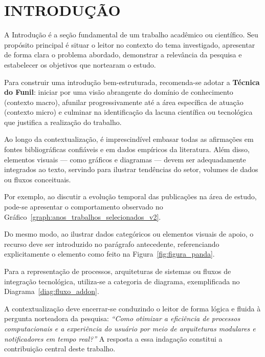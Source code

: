 \chapter{INTRODUÇÃO}
\label{chap:contextualizacao}

A Introdução é a seção fundamental de um trabalho acadêmico ou científico. Seu propósito principal é situar o leitor no contexto do tema investigado, apresentar de forma clara o problema abordado, demonstrar a relevância da pesquisa e estabelecer os objetivos que nortearam o estudo.

Para construir uma introdução bem-estruturada, recomenda-se adotar a \textbf{Técnica do Funil}: iniciar por uma visão abrangente do domínio de conhecimento (contexto macro), afunilar progressivamente até a área específica de atuação (contexto micro) e culminar na identificação da lacuna científica ou tecnológica que justifica a realização do trabalho.

Ao longo da contextualização, é imprescindível embasar todas as afirmações em fontes bibliográficas confiáveis e em dados empíricos da literatura. Além disso, elementos visuais — como gráficos e diagramas — devem ser adequadamente integrados ao texto, servindo para ilustrar tendências do setor, volumes de dados ou fluxos conceituais.

Por exemplo, ao discutir a evolução temporal das publicações na área de estudo, pode-se apresentar o comportamento observado no Gráfico~\ref{graph:anos_trabalhos_selecionados_v2}.



Do mesmo modo, ao ilustrar dados categóricos ou elementos visuais de apoio, o recurso deve ser introduzido no parágrafo antecedente, referenciando explicitamente o elemento como feito na Figura~\ref{fig:figura_panda}.



Para a representação de processos, arquiteturas de sistemas ou fluxos de integração tecnológica, utiliza-se a categoria de diagrama, exemplificada no Diagrama~\ref{diag:fluxo_addon}.



A contextualização deve encerrar-se conduzindo o leitor de forma lógica e fluida à pergunta norteadora da pesquisa: \textit{\enquote{Como otimizar a eficiência de processos computacionais e a experiência do usuário por meio de arquiteturas modulares e notificadores em tempo real?}} A resposta a essa indagação constitui a contribuição central deste trabalho.
